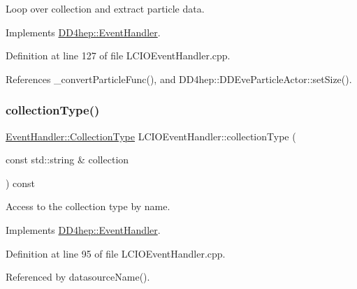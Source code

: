 Loop over collection and extract particle data. 



Implements \hyperlink{class_d_d4hep_1_1_event_handler_ae43595c2760736a7ca628183a2c91ec2}{D\+D4hep\+::\+Event\+Handler}.



Definition at line 127 of file L\+C\+I\+O\+Event\+Handler.\+cpp.



References \+\_\+convert\+Particle\+Func(), and D\+D4hep\+::\+D\+D\+Eve\+Particle\+Actor\+::set\+Size().

\hypertarget{class_d_d4hep_1_1_l_c_i_o_event_handler_a7c3518a706040840f32c6f1323b2b8ca}{}\label{class_d_d4hep_1_1_l_c_i_o_event_handler_a7c3518a706040840f32c6f1323b2b8ca} 
\subsubsection{\texorpdfstring{collection\+Type()}{collectionType()}}
{\footnotesize\ttfamily \hyperlink{class_d_d4hep_1_1_event_handler_a0b22a141a019364495835317fad48254}{Event\+Handler\+::\+Collection\+Type} L\+C\+I\+O\+Event\+Handler\+::collection\+Type (\begin{DoxyParamCaption}\item[{const std\+::string \&}]{collection }\end{DoxyParamCaption}) const\hspace{0.3cm}{\ttfamily [virtual]}}



Access to the collection type by name. 



Implements \hyperlink{class_d_d4hep_1_1_event_handler_a8424ffc2056b0e23d69c81ab2496cd51}{D\+D4hep\+::\+Event\+Handler}.



Definition at line 95 of file L\+C\+I\+O\+Event\+Handler.\+cpp.



Referenced by datasource\+Name().

\hypertarget{class_d_d4hep_1_1_l_c_i_o_event_handler_af024dd8d16f2b4b686aa83708451522f}{}\label{class_d_d4hep_1_1_l_c_i_o_event_handler_af024dd8d16f2b4b686aa83708451522f} 
